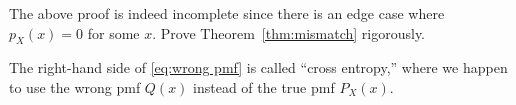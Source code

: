 \documentclass{article}
\begin{document}
\begin{exercise}
    The above proof is indeed incomplete since there is an edge case where $p_X(x) = 0$ for some $x$.
    Prove Theorem~\ref{thm:mismatch} rigorously.    
\end{exercise}

\begin{definition}
    The right-hand side of \eqref{eq:wrong pmf} is called ``cross entropy,''
    where we happen to use the wrong pmf $Q(x)$ instead of the true pmf $P_X(x)$.
\end{definition}
\end{document}
